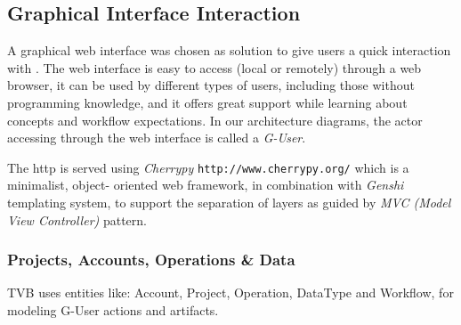 \subsection{Graphical Interface Interaction}

    A graphical web interface was chosen as solution to give users a quick
    interaction with \TVB . The web interface is easy to access (local or
    remotely) through a web browser, it can be used by different types of
    users, including those without programming knowledge, and it offers
    great support while learning about \TVB concepts and workflow
    expectations.  In our architecture diagrams, the actor accessing \TVB
    through the web interface is called a \emph{G-User}.

    The http is served using \emph{Cherrypy}
    \texttt{http://www.cherrypy.org/} which is a minimalist, object-
    oriented web framework,  in combination with \emph{Genshi} templating
    system, to support the separation of layers as guided by \emph{MVC
    (Model View Controller)} pattern.

    \subsubsection{Projects, Accounts, Operations \& Data}

    TVB uses entities like: Account, Project, Operation, DataType and
    Workflow, for modeling G-User actions and artifacts.

